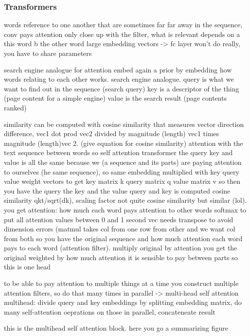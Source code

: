\documentclass{article}
\begin{document}
\subsubsection{Transformers}

words reference to one another that are sometimes far far away in the sequence, conv pays attention only close up with the filter, what is relevant depends on a this word b the other word
large embedding vectors -> fc layer won't do really, you have to share parameters

search engine analogue for attention
embed again a prior by embedding how words relating to each other works.
search engine analogue.
query is what we want to find out in the sequence (search query)
key is a descriptor of the thing (page content for a simple engine)
value is the search result (page contents ranked)

similarity can be computed with cosine similarity that measures vector direction difference, vec1 dot prod vec2 divided by magnitude (length) vec1 times magnitude (length)vec 2. 
(give equation for cosine similarity)
attention with the text sequence between words so self attention
transformer the query key and value is all the same because we (a sequence and its parts) are paying attention to ourselves (he same sequence), so same embedding multiplied with key query value weight vectors to get key matrix k query matrix q value matrix v
so then you have the query the key and the value
query and key is computed cosine similarity qkt/sqrt(dk), scaling factor not quite cosine similarity but similar (lol). you get attention: how much each word pays attention to other words
softmax to put all attention values between 0 and 1
second vec needs transpose to avoid dimension errors (matmul takes col from one row from other and we want col from both
so you have the original sequence and how much attention each word pays to each word (attention filter). multiply original by attention you get the original weighted by how much attention it is sensible to pay between parts
so this is one head

to be able to pay attention to multiple things at a time you construct multiple attention filters, so do that many times in parallel -> multi-head self attention
multihead: divide query and key embeddings by splitting embedding matrix, do many self-attention oeprations on those in parallel, concateneate result

this is the multihead self attention block. here you go a summarizing figure
\end{document}

